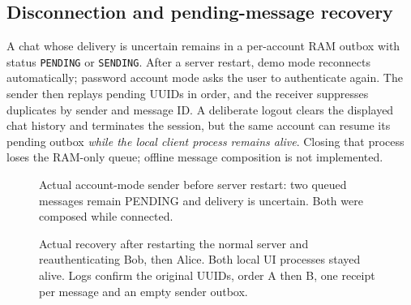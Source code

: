 \subsection{Disconnection and pending-message recovery}

A chat whose delivery is uncertain remains in a per-account RAM outbox with status \texttt{PENDING} or \texttt{SENDING}. After a server restart, demo mode reconnects automatically; password account mode asks the user to authenticate again. The sender then replays pending UUIDs in order, and the receiver suppresses duplicates by sender and message ID. A deliberate logout clears the displayed chat history and terminates the session, but the same account can resume its pending outbox \emph{while the local client process remains alive}. Closing that process loses the RAM-only queue; offline message composition is not implemented.

\begin{figure}[H]
\centering
{}
\caption{Actual account-mode sender before server restart: two queued messages remain PENDING and delivery is uncertain. Both were composed while connected.}
\label{fig:pending-evidence}
\end{figure}

\begin{figure}[H]
\centering
{}
\caption{Actual recovery after restarting the normal server and reauthenticating Bob, then Alice. Both local UI processes stayed alive. Logs confirm the original UUIDs, order A then B, one receipt per message and an empty sender outbox.}
\label{fig:recovery-evidence}
\end{figure}
